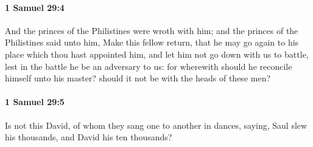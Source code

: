 		\paragraph{1 Samuel 29:4} %
			\label{1SAMUEL-29-4}

			And the princes of the Philistines were wroth with him; and the princes of the Philistines said unto him, Make this fellow return, that he may go again to his place which thou hast appointed him, and let him not go down with us to battle, lest in the battle he be an adversary to us: for wherewith should he reconcile himself unto his master? should it not be with the heads of these men?


		\paragraph{1 Samuel 29:5} %
			\label{1SAMUEL-29-5}

			Is not this David, of whom they sang one to another in dances, saying, Saul slew his thousands, and David his ten thousands?


